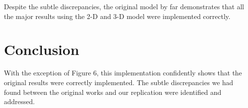 Despite the subtle discrepancies, the original model by far demonstrates that all the major results using the 2-D and 3-D model were implemented correctly. 

\section{Conclusion}

With the exception of Figure 6, this implementation confidently shows that the original results were correctly implemented. The subtle discrepancies we had found between the original works and our replication were identified and addressed.  
